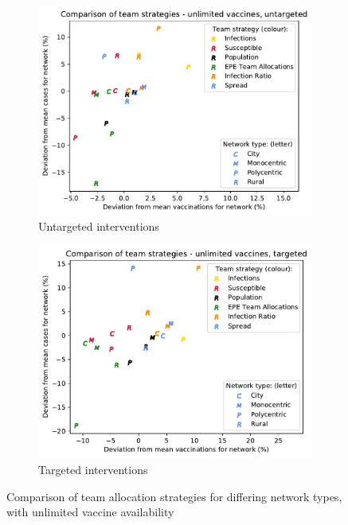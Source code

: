 \documentclass[10pt,letterpaper]{article}
\begin{document}
\begin{figure}[ht!]
  \begin{subfigure}[b]{0.51\textwidth}
    \includegraphics[width=\textwidth]{figures/strategies/team_strategy_uncapped_by_network_untargeted.pdf}
    \caption{Untargeted interventions}
    \label{fig:team_uncapped_unt}
  \end{subfigure}
  \begin{subfigure}[b]{0.49\textwidth}
    \includegraphics[width=\textwidth]{figures/strategies/team_strategy_uncapped_by_network_targeted.pdf}
    \caption{Targeted interventions}
    \label{fig:team_uncapped_tar}
  \end{subfigure}
  \caption{Comparison of team allocation strategies for differing network types, with unlimited vaccine availability}
\end{figure}
\end{document}
